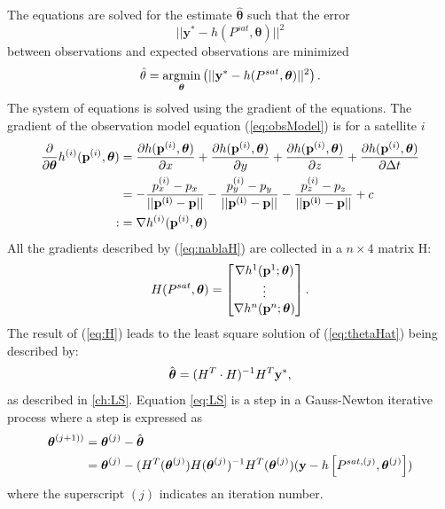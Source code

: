 The equations are solved for the estimate $\hat{\boldsymbol \theta}$ such that the error
\begin{equation}
||\textbf{y}^*-h(P^{sat},{\boldsymbol \theta})||^2
\end{equation} 
between observations and expected observations are minimized
\begin{align}\label{eq:thetaHat}
\hat{\bf \theta}=\operatorname*{argmin}_{\boldsymbol \theta}\left(||{\bf y}^*-h(P^{sat},{\boldsymbol \theta})||^2\right).
\end{align}
The system of equations is solved using the gradient of the equations. The gradient of the observation model equation (\ref{eq:obsModel}) is for a satellite $i$ 
\begin{align}
\frac{\partial}{\partial {\boldsymbol \theta}}h^{(i)}({\bf p}^{(i)},{\boldsymbol \theta})	&=
\frac{\partial h({\bf p}^{(i)},{\boldsymbol \theta})}{\partial x}+\frac{\partial h({\bf p}^{(i)},{\boldsymbol \theta})}{\partial y}+ \frac{\partial h({\bf p}^{(i)},{\boldsymbol \theta})}{\partial z}+\frac{\partial h({\bf p}^{(i)},{\boldsymbol \theta})}{\partial \Delta t} \nonumber \\
						&=-\frac{p^{(i)}_x-p_x}{||\bf p^{(i)}-p||}-\frac{p^{(i)}_y-p_y}{||\bf p^{(i)}-p||}-\frac{p^{(i)}_z-p_z}{||\bf p^{(i)}-p||}+c \nonumber \\
						:&=\nabla h^{(i)}({\bf p}^{(i)},{\boldsymbol \theta})\label{eq:nablaH}
\end{align}
All the gradients described by (\ref{eq:nablaH}) are collected in a $n\times 4$ matrix H:
\begin{align}\label{eq:H}
H(P^{sat},{\boldsymbol \theta})=\begin{bmatrix}
\nabla h^1({\bf p}^{1};{\boldsymbol \theta}) \\
\vdots \\
\nabla h^n({\bf p}^{n};{\boldsymbol \theta})
\end{bmatrix}.
\end{align}
The result of (\ref{eq:H}) leads to the least square solution of (\ref{eq:thetaHat}) being described by:
\begin{align}\label{eq:LS}
\hat{{\boldsymbol \theta}}=(H^T\cdot H)^{-1}H^T{\bf y}^*,
\end{align}
as described in \ref{ch:LS}. Equation \ref{eq:LS} is a step in a Gauss-Newton iterative process where a step is expressed as 
\begin{align*}
{\boldsymbol \theta}^{(j+1))}	& =
{\boldsymbol \theta}^{(j)}-\hat{{\boldsymbol \theta}}\\
				& =
{\boldsymbol \theta}^{(j)}-(H^T({\boldsymbol \theta}^{(j)})H({\boldsymbol \theta}^{(j)})^{-1}H^T({\boldsymbol \theta}^{(j)})({\bf y}- h\left[P^{sat, (j)},{\boldsymbol \theta}^{(j)}\right])
\end{align*}
where the superscript $(j)$ indicates an iteration number.\\
